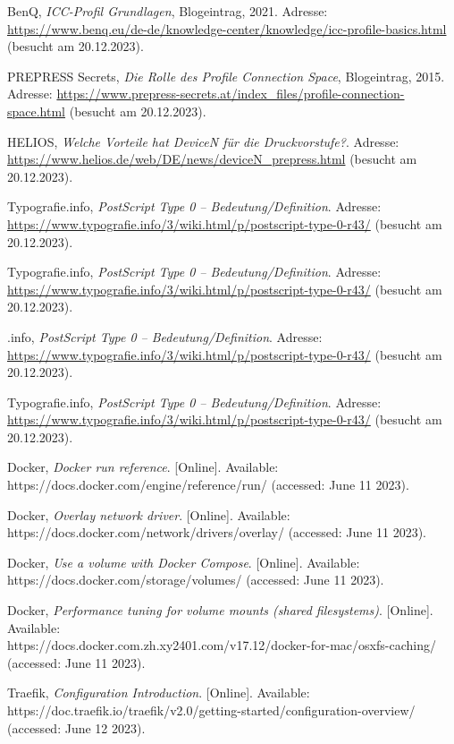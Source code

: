 \begin{referenceslist}
	\itemk BenQ, \emph{ICC-Profil Grundlagen}, Blogeintrag, 2021. Adresse: \url{https://www.benq.eu/de-de/knowledge-center/knowledge/icc-profile-basics.html} (besucht am 20.12.2023).
	
	\iteml PREPRESS Secrets, \emph{Die Rolle des Profile Connection Space}, Blogeintrag, 2015. Adresse: \url{https://www.prepress-secrets.at/index_files/profile-connection-space.html} (besucht am 20.12.2023).
	
	\itemm HELIOS, \emph{Welche Vorteile hat DeviceN für die Druckvorstufe?}. Adresse: \url{https://www.helios.de/web/DE/news/deviceN_prepress.html} (besucht am 20.12.2023).
	
	\itemn Typografie.info, \emph{PostScript Type 0 – Bedeutung/Definition}. Adresse: \url{https://www.typografie.info/3/wiki.html/p/postscript-type-0-r43/} (besucht am 20.12.2023).
	
	\itemo Typografie.info, \emph{PostScript Type 0 – Bedeutung/Definition}. Adresse: \url{https://www.typografie.info/3/wiki.html/p/postscript-type-0-r43/} (besucht am 20.12.2023).
	
	\itempTypografie.info, \emph{PostScript Type 0 – Bedeutung/Definition}. Adresse: \url{https://www.typografie.info/3/wiki.html/p/postscript-type-0-r43/} (besucht am 20.12.2023).
	
	\itemq Typografie.info, \emph{PostScript Type 0 – Bedeutung/Definition}. Adresse: \url{https://www.typografie.info/3/wiki.html/p/postscript-type-0-r43/} (besucht am 20.12.2023).
	
	\itemr Docker, \emph{Docker run reference}. [Online]. Available: \\
	https://docs.docker.com/engine/reference/run/  (accessed: June 11 2023).
	
	\items Docker, \emph{Overlay network driver}. [Online]. Available: \\
	https://docs.docker.com/network/drivers/overlay/  (accessed: June 11 2023).
	
	\itemt Docker, \emph{Use a volume with Docker Compose}. [Online]. Available: \\
	https://docs.docker.com/storage/volumes/  (accessed: June 11 2023).
	
	\itemu Docker, \emph{Performance tuning for volume mounts (shared filesystems)}. [Online]. Available: \\
	https://docs.docker.com.zh.xy2401.com/v17.12/docker-for-mac/osxfs-caching/  (accessed: June 11 2023).
	
	\itemv Traefik, \emph{Configuration Introduction}. [Online]. Available: \\
	https://doc.traefik.io/traefik/v2.0/getting-started/configuration-overview/  (accessed: June 12 2023).
\end{referenceslist}
